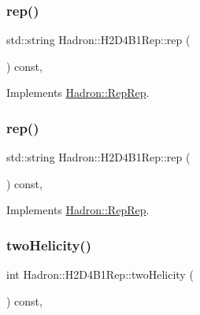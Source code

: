\subsubsection{\texorpdfstring{rep()}{rep()}\hspace{0.1cm}{\footnotesize\ttfamily [2/3]}}
{\footnotesize\ttfamily std\+::string Hadron\+::\+H2\+D4\+B1\+Rep\+::rep (\begin{DoxyParamCaption}{ }\end{DoxyParamCaption}) const\hspace{0.3cm}{\ttfamily [inline]}, {\ttfamily [virtual]}}



Implements \mbox{\hyperlink{structHadron_1_1RepRep_ab3213025f6de249f7095892109575fde}{Hadron\+::\+Rep\+Rep}}.

\mbox{\label{structHadron_1_1H2D4B1Rep_a4f33e88c9985a78b47926b04736e7971}} 
\subsubsection{\texorpdfstring{rep()}{rep()}\hspace{0.1cm}{\footnotesize\ttfamily [3/3]}}
{\footnotesize\ttfamily std\+::string Hadron\+::\+H2\+D4\+B1\+Rep\+::rep (\begin{DoxyParamCaption}{ }\end{DoxyParamCaption}) const\hspace{0.3cm}{\ttfamily [inline]}, {\ttfamily [virtual]}}



Implements \mbox{\hyperlink{structHadron_1_1RepRep_ab3213025f6de249f7095892109575fde}{Hadron\+::\+Rep\+Rep}}.

\mbox{\label{structHadron_1_1H2D4B1Rep_af76e49b62cabfe0d55dec970eca37ca3}} 
\subsubsection{\texorpdfstring{twoHelicity()}{twoHelicity()}\hspace{0.1cm}{\footnotesize\ttfamily [1/2]}}
{\footnotesize\ttfamily int Hadron\+::\+H2\+D4\+B1\+Rep\+::two\+Helicity (\begin{DoxyParamCaption}{ }\end{DoxyParamCaption}) const\hspace{0.3cm}{\ttfamily [inline]}, {\ttfamily [virtual]}}

